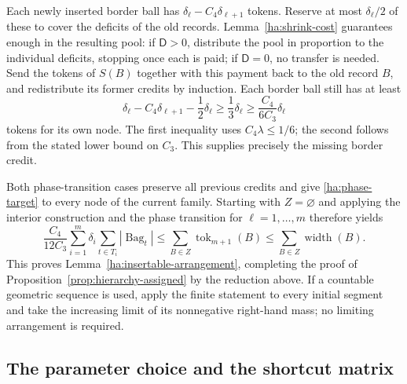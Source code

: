 \documentclass[11pt]{amsart}
\theoremstyle{definition}
\theoremstyle{remark}
\numberwithin{equation}{section}
\begin{document}
Each newly inserted border ball has
$\delta_\ell-C_4\delta_{\ell+1}$ tokens.  Reserve at most
$\delta_\ell/2$ of these to cover the deficits of the old records.
Lemma~\ref{ha:shrink-cost} guarantees enough in the resulting pool:
if $\mathsf D>0$, distribute the pool in proportion to the individual
deficits, stopping once each is paid; if $\mathsf D=0$, no transfer is
needed.  Send the tokens of $S(B)$ together with this payment back
to the old record $B$, and redistribute its former credits by
induction.  Each border ball still has at least
\[
 \delta_\ell-C_4\delta_{\ell+1}-\frac12\delta_\ell
 \ge\frac13\delta_\ell
 \ge\frac{C_4}{6C_3}\delta_\ell
\]
tokens for its own node.  The first inequality uses
$C_4\lambda\le1/6$; the second follows from the stated lower bound
on $C_3$.  This supplies precisely the missing border credit.

Both phase-transition cases preserve all previous credits and
give \eqref{ha:phase-target} to every node of the current family.
Starting with $Z=\varnothing$ and applying the interior construction
and the phase transition for $\ell=1,\ldots,m$ therefore yields
\[
 \frac{C_4}{12C_3}
 \sum_{i=1}^m\delta_i\sum_{t\in T_i}|\operatorname{Bag}_t|
 \le\sum_{B\in Z}\operatorname{tok}_{m+1}(B)
 \le\sum_{B\in Z}\operatorname{width}(B).
\]
This proves Lemma~\ref{ha:insertable-arrangement}, completing the
proof of Proposition~\ref{prop:hierarchy-assigned} by the reduction
above.  If a countable geometric sequence is used, apply the finite
statement to every initial segment and take the increasing limit
of its nonnegative right-hand mass; no limiting arrangement is
required.



\subsection{The parameter choice and the shortcut matrix}
\label{hp:endpoint}
\end{document}
